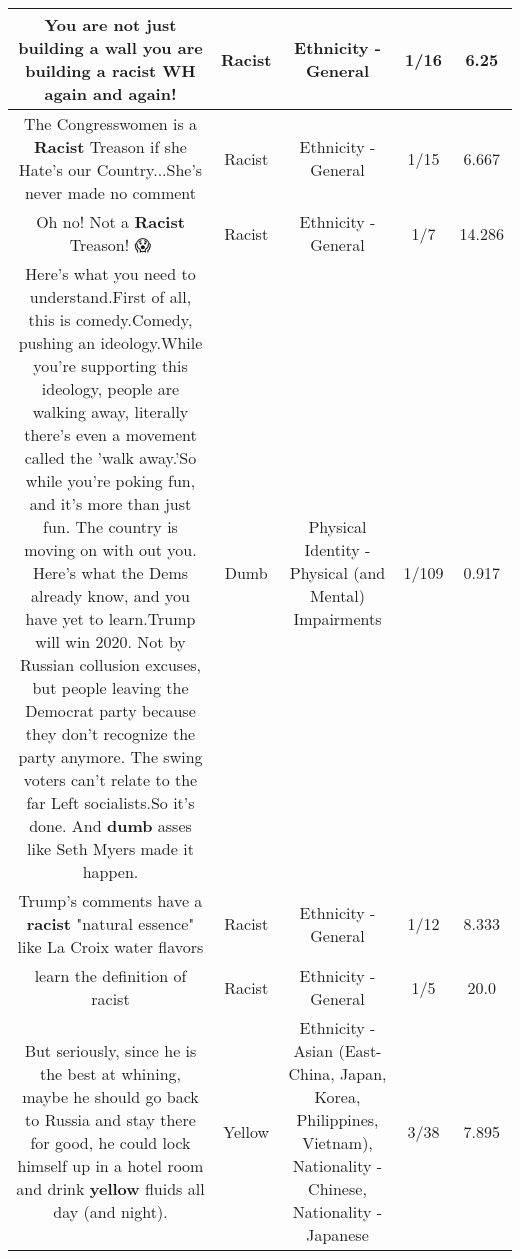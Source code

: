 \documentclass[11pt]{article}
\newlength\mylength
\begin{document}
\begin{center}
\begin{longtable}{|C{.65\mylength}|C{.30\mylength}|C{.12\mylength}|C{.12\mylength}|C{.12\mylength}|}
  \small You are not just building a wall you are building a \textbf{racist} WH again and again!\normalsize   & Racist & Ethnicity - General & 1/16 & 6.25 \\  \hline
  \small The Congresswomen is a \textbf{Racist} Treason if she Hate's our Country...She's never made no comment\normalsize   & Racist & Ethnicity - General & 1/15 & 6.667 \\  \hline
  \small Oh no! Not a \textbf{Racist} Treason! 😱\normalsize   & Racist & Ethnicity - General & 1/7 & 14.286 \\  \hline
  \small Here's what you need to understand.First of all, this is comedy.Comedy, pushing an ideology.While you're supporting this ideology, people are walking away, literally there's even a movement called the 'walk away.'So while you're poking fun, and it's more than just fun. The country is moving on with out you. Here's what the Dems already know, and you have yet to learn.Trump will win 2020. Not by Russian collusion excuses, but people leaving the Democrat party because they don't recognize the party anymore. The swing voters can't relate to the far Left socialists.So it's done. And \textbf{dumb} asses like Seth Myers made it happen.\normalsize   & Dumb & Physical Identity - Physical (and Mental) Impairments & 1/109 & 0.917 \\  \hline
  \small Trump's comments have a \textbf{racist} "natural essence" like La Croix water flavors\normalsize   & Racist & Ethnicity - General & 1/12 & 8.333 \\  \hline
  \small learn the definition of racist\normalsize   & Racist & Ethnicity - General & 1/5 & 20.0 \\  \hline
  \small But seriously, since he is the best at whining, maybe he should go back to Russia and stay there for good, he could lock himself up in a hotel room and drink \textbf{y\textbf{e\textbf{llow}}} fluids all day (and night).\normalsize   & Yellow & Ethnicity - Asian (East- China, Japan, Korea, Philippines, Vietnam), Nationality - Chinese, Nationality - Japanese & 3/38 & 7.895 \\  \hline

\end{longtable}
\end{center}
\end{document}
